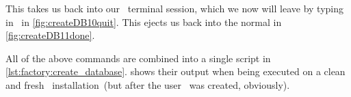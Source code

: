 This takes us back into our \psql\ terminal session, which we now will leave by typing in~\sqlil{\\q} in \cref{fig:createDB10quit}.
This ejects us back into the normal  in \cref{fig:createDB11done}.

All of the above commands are combined into a single script in \cref{lst:factory:create_database}.
 shows their output when being executed on a clean and fresh \postgresql\ installation~(but after the user~ was created, obviously).%
%
\FloatBarrier%
\endhsection%
%
